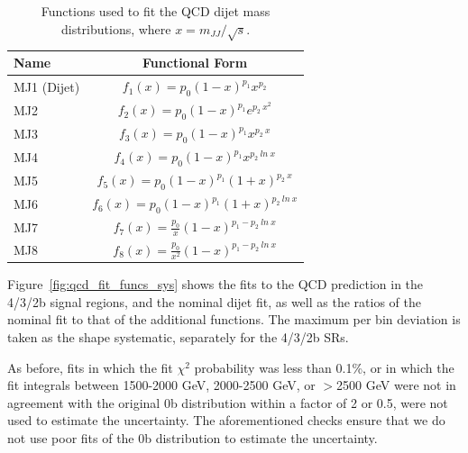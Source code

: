 \begin{table}[htbp!]
\begin{center} 
\begin{tabular}{  l | c}
Name & Functional Form \\
\hline
MJ1 (Dijet) & $f_{1}(x) = p_0 (1-x)^{p_1} x^{p_2}$ \\
MJ2 & $f_{2}(x) = p_0 (1-x)^{p_1} e^{p_2\ x^2}$ \\
MJ3 & $f_{3}(x) = p_0 (1-x)^{p_1} x^{p_2\ x}$ \\
MJ4 & $f_{4}(x) = p_0 (1-x)^{p_1} x^{p_2\ ln\ x}$ \\
MJ5 & $f_{5}(x) = p_0 (1-x)^{p_1} (1+x)^{p_2\ x}$ \\
MJ6 & $f_{6}(x) = p_0 (1-x)^{p_1} (1+x)^{p_2\ ln\ x}$ \\
MJ7 & $f_{7}(x) = \frac{p_0}{x} (1-x)^{p_1 - p_2\ ln\ x}$ \\
MJ8 & $f_{8}(x) = \frac{p_0}{x^2} (1-x)^{p_1 - p_2\ ln\ x}$ \\
\hline
\end{tabular}
\caption{Functions used to fit the QCD dijet mass distributions, where $x = m_{JJ} / \sqrt{s}$.}
\label{tab:fit_funcs}
\end{center}
\end{table}

Figure~\ref{fig:qcd_fit_funcs_sys} shows the fits to the QCD prediction in the 4/3/2b  signal regions, and the nominal dijet fit, as well as the ratios of the nominal fit to that of the additional functions.  The maximum per bin deviation is taken as the shape systematic, separately for the 4/3/2b SRs.

As before, fits in which the fit $\chi^2$ probability was less than 0.1\%,  or in which the fit integrals between 1500-2000 GeV, 2000-2500 GeV, or $>$2500 GeV were not in agreement with the original 0b distribution within a factor of 2 or 0.5, were not used to estimate the uncertainty.  The aforementioned checks ensure that we do not use poor fits of the 0b distribution to estimate the uncertainty.

